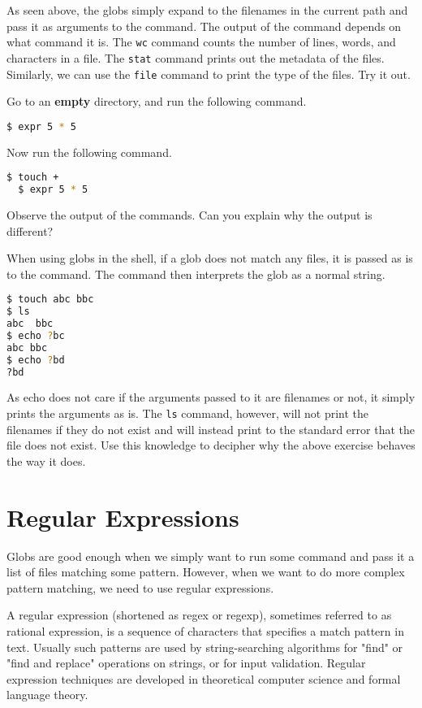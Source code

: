 As seen above, the globs simply expand to the filenames in the current path
and pass it as arguments to the command. The output of the command depends
on what command it is. The \texttt{wc} command counts the number of lines,
words, and characters in a file. The \texttt{stat} command prints out the
metadata of the files. Similarly, we can use the \texttt{file} command to
print the type of the files. Try it out.

\begin{exercise}
  Go to an \textbf{empty} directory, and run the following command.
  \begin{lstlisting}[language=bash]
  $ expr 5 * 5
  \end{lstlisting}
  Now run the following command.
  \begin{lstlisting}[language=bash]
  $ touch +
  $ expr 5 * 5
  \end{lstlisting}
  Observe the output of the commands.
  Can you explain why the output is different?
\end{exercise}

When using globs in the shell, if a glob does not match any files, it is
passed as is to the command. The command then interprets the glob as a
normal string.

\begin{lstlisting}[language=bash]
$ touch abc bbc
$ ls
abc  bbc
$ echo ?bc
abc bbc
$ echo ?bd
?bd
\end{lstlisting}

As echo does not care if the arguments passed to it are filenames or not,
it simply prints the arguments as is. The \texttt{ls} command, however,
will not print the filenames if they do not exist and will instead print
to the standard error that the file does not exist. Use this knowledge
to decipher why the above exercise behaves the way it does.

\section{Regular Expressions}

Globs are good enough when we simply want to run some command and pass
it a list of files matching some pattern. However, when we want to
do more complex pattern matching, we need to use regular expressions.

\begin{definition}
A regular expression (shortened as regex or regexp), sometimes
referred to as rational expression, is a sequence of characters
that specifies a match pattern in text. Usually such patterns are
used by string-searching algorithms for "find" or "find and replace"
operations on strings, or for input validation. Regular expression
techniques are developed in theoretical computer science and formal
language theory.
\end{definition}

